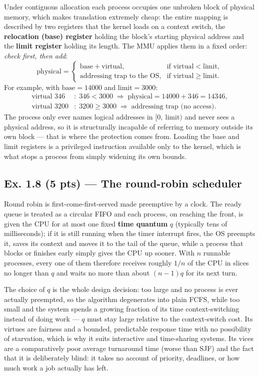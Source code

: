 Under contiguous allocation each process occupies one unbroken block of physical memory,
which makes translation extremely cheap: the entire mapping is described by two registers
that the kernel loads on a context switch, the \textbf{relocation (base) register} holding
the block's starting physical address and the \textbf{limit register} holding its length.
The MMU applies them in a fixed order: \emph{check first, then add}:
%
\begin{equation}
  \label{p2:eq:reloc}
  \text{physical} =
  \begin{cases}
    \text{base} + \text{virtual}, & \text{if } \text{virtual} < \text{limit},\\[2pt]
    \text{addressing trap to the OS}, & \text{if } \text{virtual} \ge \text{limit}.
  \end{cases}
\end{equation}
%
For example, with $\text{base} = 14000$ and $\text{limit} = 3000$:
%
\begin{align*}
  \text{virtual } 346 &: \; 346 < 3000 \;\Rightarrow\; \text{physical} = 14000 + 346 = 14346,\\
  \text{virtual } 3200 &: \; 3200 \ge 3000 \;\Rightarrow\; \text{addressing trap (no access)}.
\end{align*}
%
The process only ever names logical addresses in $[0,\ \text{limit})$ and never sees a
physical address, so it is structurally incapable of referring to memory outside its own
block --- that is where the protection comes from. Loading the base and limit registers is
a privileged instruction available only to the kernel, which is what stops a process from
simply widening its own bounds.

\subsection*{Ex. 1.8 (5 pts) --- The round-robin scheduler}
\label{p2:sec:rr}

Round robin is first-come-first-served made preemptive by a clock. The ready queue is
treated as a circular FIFO and each process, on reaching the front, is given the CPU for
at most one fixed \textbf{time quantum} $q$ (typically tens of milliseconds); if it is
still running when the timer interrupt fires, the OS preempts it, saves its context and
moves it to the tail of the queue, while a process that blocks or finishes early simply
gives the CPU up sooner. With $n$ runnable processes, every one of them therefore receives
roughly $1/n$ of the CPU in slices no longer than $q$ and waits no more than about
$(n-1)q$ for its next turn.

The choice of $q$ is the whole design decision: too large and no process is ever actually
preempted, so the algorithm degenerates into plain FCFS, while too small and the system
spends a growing fraction of its time context-switching instead of doing work --- $q$ must
stay large relative to the context-switch cost. Its virtues are fairness and a bounded,
predictable response time with no possibility of starvation, which is why it suits
interactive and time-sharing systems. Its vices are a comparatively poor average
turnaround time (worse than SJF) and the fact that it is deliberately blind: it takes no
account of priority, deadlines, or how much work a job actually has left.

